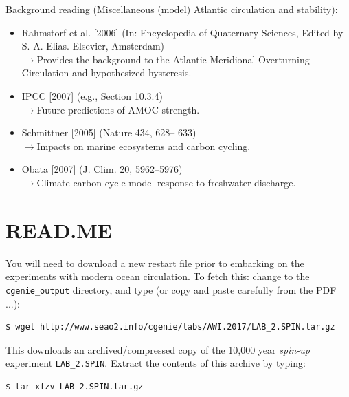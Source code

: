 \documentclass[11pt,fleqn]{book} %
\begin{document}
\vspace{2mm}
\noindent Background reading (Miscellaneous (model) Atlantic circulation and stability):

\vspace{2mm}
\begin{itemize}
\item Rahmstorf et al. [2006] (In: Encyclopedia of Quaternary Sciences, Edited by S. A. Elias. Elsevier, Amsterdam)
\\\(\rightarrow\)Provides the background to the Atlantic Meridional Overturning Circulation and hypothesized hysteresis.
\item IPCC [2007] (e.g., Section 10.3.4)
\\\(\rightarrow\)Future predictions of AMOC strength.
\item Schmittner [2005] (Nature 434, 628– 633)
\\\(\rightarrow\)Impacts on marine ecosystems and carbon cycling.
\item Obata [2007] (J. Clim. 20, 5962–5976)
\\\(\rightarrow\)Climate-carbon cycle model response to freshwater discharge.
\end{itemize}


\newpage


\section*{READ.ME}

You will need to download a new restart file prior to embarking on the experiments with modern ocean circulation.
To fetch this: change to the \texttt{cgenie\_output} directory, and type (or copy and paste carefully from the PDF ...):

\begin{verbatim}
$ wget http://www.seao2.info/cgenie/labs/AWI.2017/LAB_2.SPIN.tar.gz
\end{verbatim}

This downloads an archived/compressed copy of the 10,000 year \textit{spin-up} experiment \texttt{LAB\_2.SPIN}. Extract the contents of this archive by typing:

\begin{verbatim}
$ tar xfzv LAB_2.SPIN.tar.gz 
\end{verbatim}
\end{document}
